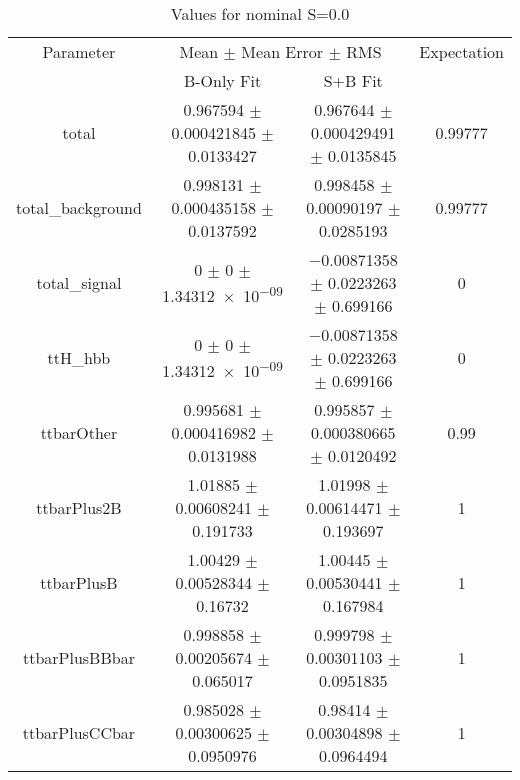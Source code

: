 \begin{table}
\centering
\caption{Values for nominal S=0.0}
\begin{tabular}{cccc}
\toprule
Parameter & \multicolumn{2}{c}{Mean $\pm$ Mean Error $\pm$ RMS} & Expectation\\
 & B-Only Fit & S+B Fit & \\
\midrule
total & \num{0.967594} $\pm$ \num{0.000421845} $\pm$ \num{0.0133427} & \num{0.967644} $\pm$ \num{0.000429491} $\pm$ \num{0.0135845} & \num{0.99777}\\
total\_background & \num{0.998131} $\pm$ \num{0.000435158} $\pm$ \num{0.0137592} & \num{0.998458} $\pm$ \num{0.00090197} $\pm$ \num{0.0285193} & \num{0.99777}\\
total\_signal & \num{0} $\pm$ \num{0} $\pm$ \num{1.34312e-09} & \num{-0.00871358} $\pm$ \num{0.0223263} $\pm$ \num{0.699166} & \num{0}\\
ttH\_hbb & \num{0} $\pm$ \num{0} $\pm$ \num{1.34312e-09} & \num{-0.00871358} $\pm$ \num{0.0223263} $\pm$ \num{0.699166} & \num{0}\\
ttbarOther & \num{0.995681} $\pm$ \num{0.000416982} $\pm$ \num{0.0131988} & \num{0.995857} $\pm$ \num{0.000380665} $\pm$ \num{0.0120492} & \num{0.99}\\
ttbarPlus2B & \num{1.01885} $\pm$ \num{0.00608241} $\pm$ \num{0.191733} & \num{1.01998} $\pm$ \num{0.00614471} $\pm$ \num{0.193697} & \num{1}\\
ttbarPlusB & \num{1.00429} $\pm$ \num{0.00528344} $\pm$ \num{0.16732} & \num{1.00445} $\pm$ \num{0.00530441} $\pm$ \num{0.167984} & \num{1}\\
ttbarPlusBBbar & \num{0.998858} $\pm$ \num{0.00205674} $\pm$ \num{0.065017} & \num{0.999798} $\pm$ \num{0.00301103} $\pm$ \num{0.0951835} & \num{1}\\
ttbarPlusCCbar & \num{0.985028} $\pm$ \num{0.00300625} $\pm$ \num{0.0950976} & \num{0.98414} $\pm$ \num{0.00304898} $\pm$ \num{0.0964494} & \num{1}\\
\bottomrule
\end{tabular}
\end{table}